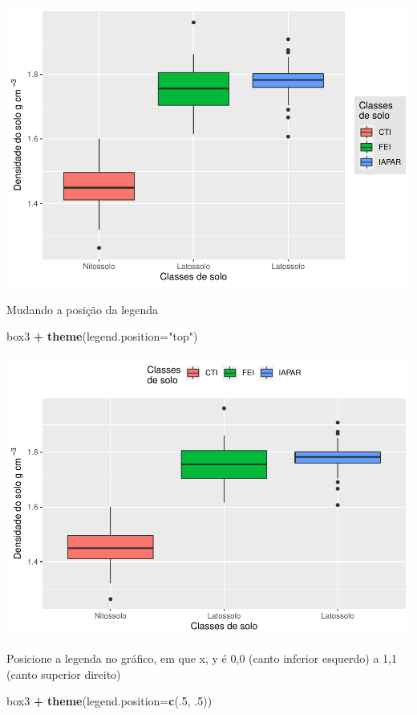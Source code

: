 \documentclass[]{book}
\newenvironment{Shaded}{\begin{snugshade}}{\end{snugshade}}
\newcommand{\DataTypeTok}[1]{\textcolor[rgb]{0.13,0.29,0.53}{#1}}
\newcommand{\DecValTok}[1]{\textcolor[rgb]{0.00,0.00,0.81}{#1}}
\newcommand{\FloatTok}[1]{\textcolor[rgb]{0.00,0.00,0.81}{#1}}
\newcommand{\KeywordTok}[1]{\textcolor[rgb]{0.13,0.29,0.53}{\textbf{#1}}}
\newcommand{\NormalTok}[1]{#1}
\newcommand{\OperatorTok}[1]{\textcolor[rgb]{0.81,0.36,0.00}{\textbf{#1}}}
\newcommand{\StringTok}[1]{\textcolor[rgb]{0.31,0.60,0.02}{#1}}
\begin{document}
\includegraphics{TudodoR_files/figure-latex/unnamed-chunk-214-2.pdf}

Mudando a posição da legenda

\begin{Shaded}
\begin{Highlighting}[]
\NormalTok{box3 }\OperatorTok{+}\StringTok{ }\KeywordTok{theme}\NormalTok{(}\DataTypeTok{legend.position=}\StringTok{"top"}\NormalTok{)}
\end{Highlighting}
\end{Shaded}

\includegraphics{TudodoR_files/figure-latex/unnamed-chunk-215-1.pdf}

Posicione a legenda no gráfico, em que x, y é 0,0 (canto inferior esquerdo) a 1,1 (canto superior direito)

\begin{Shaded}
\begin{Highlighting}[]
\NormalTok{box3 }\OperatorTok{+}\StringTok{ }\KeywordTok{theme}\NormalTok{(}\DataTypeTok{legend.position=}\KeywordTok{c}\NormalTok{(.}\DecValTok{5}\NormalTok{, }\FloatTok{.5}\NormalTok{))}
\end{Highlighting}
\end{Shaded}
\end{document}
